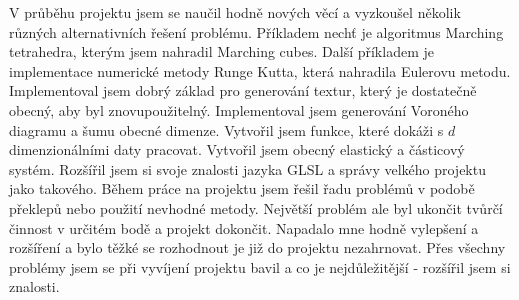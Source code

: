 V průběhu projektu jsem se naučil hodně nových věcí a vyzkoušel několik různých alternativních řešení problému.
Příkladem nechť je algoritmus Marching tetrahedra, kterým jsem nahradil Marching cubes.
Další příkladem je implementace numerické metody Runge Kutta, která nahradila Eulerovu metodu.
Implementoval jsem dobrý základ pro generování textur, který je dostatečně obecný, aby byl znovupoužitelný.
Implementoval jsem generování Voroného diagramu a šumu obecné dimenze.
Vytvořil jsem funkce, které dokáži s $d$ dimenzionálními daty pracovat.
Vytvořil jsem obecný elastický a částicový systém.
Rozšířil jsem si svoje znalosti jazyka GLSL a správy velkého projektu jako takového.
Během práce na projektu jsem řešil řadu problémů v podobě překlepů nebo použití nevhodné metody.
Největší problém ale byl ukončit tvůrčí činnost v určitém bodě a projekt dokončit.
Napadalo mne hodně vylepšení a rozšíření a bylo těžké se rozhodnout je již do projektu nezahrnovat.
Přes všechny problémy jsem se při vyvíjení projektu bavil a co je nejdůležitější - rozšířil jsem si znalosti.

